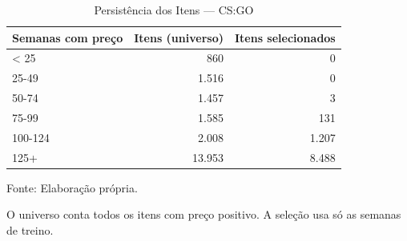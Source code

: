 \begin{table}[H]
\caption{Persistência dos Itens — CS:GO}\label{tab:coverage_items} 

\fontsize{12.0pt}{14.4pt}\selectfont

\begin{tabular*}{\linewidth}{@{\extracolsep{\fill}}lrr}
\toprule
\textbf{Semanas com preço} & \textbf{Itens (universo)} & \textbf{Itens selecionados} \\
\midrule\addlinespace[2.5pt]
< 25 & 860 & 0 \\
25-49 & 1.516 & 0 \\
50-74 & 1.457 & 3 \\
75-99 & 1.585 & 131 \\
100-124 & 2.008 & 1.207 \\
125+ & 13.953 & 8.488 \\
\bottomrule
\end{tabular*}
\par\vspace{\belowcaptionskip}\footnotesize Fonte: Elaboração própria.\par
\begin{minipage}{\linewidth}
O universo conta todos os itens com preço positivo. A seleção usa só as semanas de treino.\\
\end{minipage}
\end{table}

